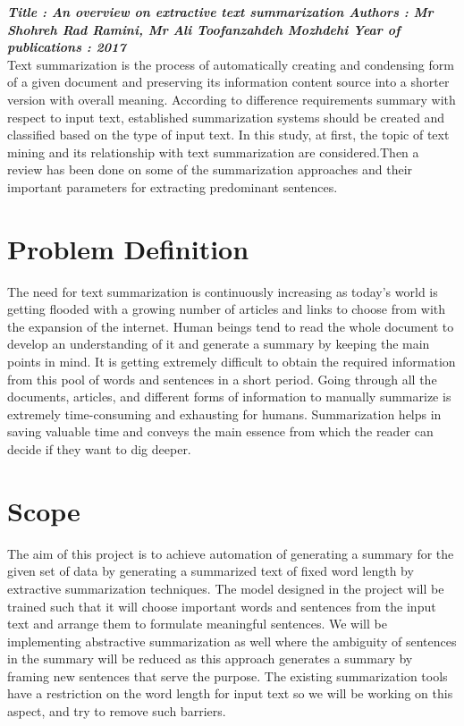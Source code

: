 \textbf{\textit{Title : An overview on extractive text summarization
Authors : Mr Shohreh Rad Ramini, Mr Ali Toofanzahdeh Mozhdehi
Year of publications : 2017}}\\
Text summarization is the process of automatically creating and condensing form of a given document and preserving its information content source into a shorter version with overall meaning. According to difference requirements summary with respect to input text, established summarization systems should be created and classified based on the type of input text. In this study, at first, the topic of text mining and its relationship with text summarization are considered.Then a review has been done on some of the summarization approaches and their important parameters for extracting predominant sentences.
\\

\section{Problem Definition}
The need for text summarization is continuously increasing as today's world is getting flooded with a growing number of articles and links to choose from with the expansion of the internet. 
Human beings tend to read the whole document to develop an understanding of it and generate a summary by keeping the main points in mind. It is getting extremely difficult to obtain the required information from this pool of words and sentences in a short period. 
Going through all the documents, articles, and different forms of information to manually summarize is extremely time-consuming and exhausting for humans. Summarization helps in saving valuable time and conveys the main essence from which the reader can decide if they want to dig deeper.

\section{Scope}
The aim of this project is to achieve automation of generating a summary for the given set of data by generating a summarized text of fixed word length by extractive summarization techniques. 
The model designed in the project will be trained such that it will choose important words and sentences from the input text and arrange them to formulate meaningful sentences. 
We will be implementing abstractive summarization as well where the ambiguity of sentences in the summary will be reduced as this approach generates a summary by framing new sentences that serve the purpose.  
The existing summarization tools have a restriction on the word length for input text so we will be working on this aspect, and try to remove such barriers.

